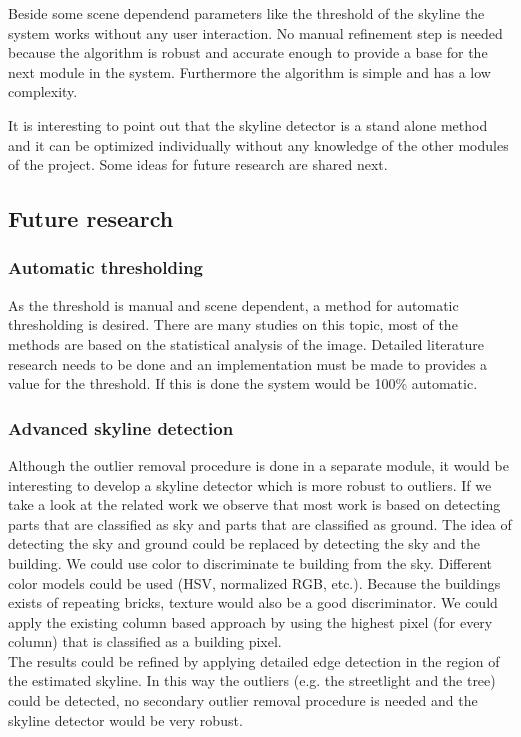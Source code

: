 Beside some scene dependend parameters like the threshold of the skyline the
system works without any user interaction. No manual refinement step is needed
because the algorithm is robust and accurate enough to provide a base for the
next module in the system. Furthermore the algorithm is simple and has a low
complexity. 

It is interesting to point out that the skyline detector is a stand alone method
and it can be optimized individually without any knowledge of the other modules
of the project.  Some ideas for future research are shared next.

\subsection{Future research}
\subsubsection{Automatic thresholding}
As the threshold is manual and scene dependent, a method for automatic
thresholding is desired. There are many studies on this topic, most of the
methods are based on the statistical analysis of the image. Detailed literature
research needs to be done and an implementation must be made to provides a value
for the threshold. If this is done the system would be 100\% automatic.

\subsubsection{Advanced skyline detection}
Although the outlier removal procedure is done in a separate module, it would be
interesting to develop a skyline detector which is more robust to
outliers. 
If we take a look at the related work we observe that most work is based on
detecting parts that are classified as sky and parts that are classified as
ground. The idea of detecting the sky and ground could be replaced by detecting
the sky and the building. We could use color to discriminate te building from
the sky. Different color models could be used (HSV, normalized RGB, etc.).
Because the buildings exists of repeating bricks, texture would also be a good
discriminator. We could apply the existing column based approach by using the
highest pixel (for every column) that is classified as a building pixel.\\

The results could be refined by applying detailed edge detection in the region of
the estimated skyline. In this way the outliers (e.g. the streetlight and the
tree) could be detected, no secondary outlier removal procedure is needed and
the skyline detector would be very robust.




